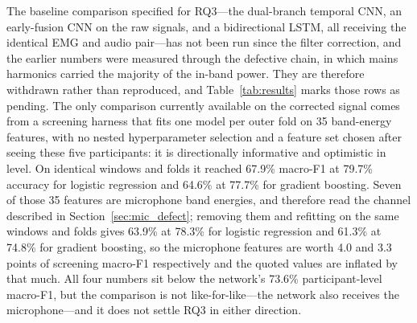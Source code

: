 \documentclass[pdflatex,sn-nature,iicol]{sn-jnl}
\begin{document}
The baseline comparison specified for RQ3---the dual-branch temporal CNN, an early-fusion CNN on the raw signals, and a bidirectional LSTM, all receiving the identical EMG and audio pair---has not been run since the filter correction, and the earlier numbers were measured through the defective chain, in which mains harmonics carried the majority of the in-band power. They are therefore withdrawn rather than reproduced, and Table~\ref{tab:results} marks those rows as pending. The only comparison currently available on the corrected signal comes from a screening harness that fits one model per outer fold on 35 band-energy features, with no nested hyperparameter selection and a feature set chosen after seeing these five participants: it is directionally informative and optimistic in level. On identical windows and folds it reached 67.9\% macro-F1 at 79.7\% accuracy for logistic regression and 64.6\% at 77.7\% for gradient boosting. Seven of those 35 features are microphone band energies, and therefore read the channel described in Section~\ref{sec:mic_defect}; removing them and refitting on the same windows and folds gives 63.9\% at 78.3\% for logistic regression and 61.3\% at 74.8\% for gradient boosting, so the microphone features are worth 4.0 and 3.3 points of screening macro-F1 respectively and the quoted values are inflated by that much. All four numbers sit below the network's 73.6\% participant-level macro-F1, but the comparison is not like-for-like---the network also receives the microphone---and it does not settle RQ3 in either direction.
\end{document}
